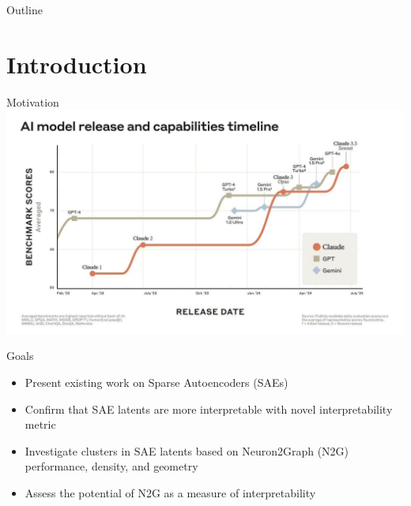 \documentclass[aspectratio=169,hyperref={pdfpagelabels=false}]{beamer}
\title{\thesistitle}
\subtitle{\thesissubtitle}
\begin{document}
\inserttitlepage


\begin{frame}{Outline} %
	\tableofcontents

\end{frame}
\note{

}


\section{Introduction} %
\begin{frame}{Motivation} %
    \includegraphics[height=0.8\textheight]{../images/ai_timeline.jpg}
\end{frame}

\begin{frame}{Goals} %
    \begin{itemize}
        \item Present existing work on Sparse Autoencoders (SAEs)
        \item Confirm that SAE latents are more interpretable with novel interpretability metric
        \item Investigate clusters in SAE latents based on Neuron2Graph (N2G) performance, density, and geometry
        \item Assess the potential of N2G as a measure of interpretability
    \end{itemize}
\end{frame}
\end{document}

